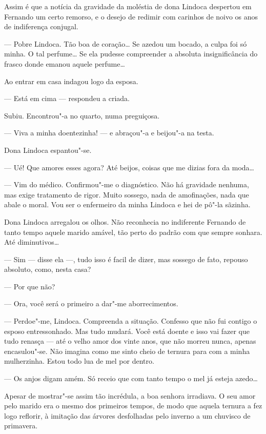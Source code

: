 Assim é que a notícia da gravidade da moléstia de dona Lindoca despertou
em Fernando um certo remorso, e o desejo de redimir com carinhos de
noivo os anos de indiferença conjugal.

--- Pobre Lindoca. Tão boa de coração\ldots{} Se azedou um bocado, a culpa
foi só minha. O tal perfume\ldots{} Se ela pudesse compreender a absoluta
insignificância do frasco donde emanou aquele perfume\ldots{}

Ao entrar em casa indagou logo da esposa.

--- Está em cima --- respondeu a criada.

Subiu. Encontrou"-a no quarto, numa preguiçosa.

--- Viva a minha doentezinha! --- e abraçou"-a e beijou"-a na testa.

Dona Lindoca espantou"-se.

--- Ué! Que amores esses agora? Até beijos, coisas que me dizias fora da
moda\ldots{}

--- Vim do médico. Confirmou"-me o diagnóstico. Não há gravidade nenhuma,
mas exige tratamento de rigor. Muito sossego, nada de amofinações, nada
que abale o moral. Vou ser o enfermeiro da minha Lindoca e hei de pô"-la
sãzinha.

Dona Lindoca arregalou os olhos. Não reconhecia no indiferente Fernando
de tanto tempo aquele marido amável, tão perto do padrão com que sempre
sonhara. Até diminutivos\ldots{}

--- Sim --- disse ela ---, tudo isso é facil de dizer, mas sossego de
fato, repouso absoluto, como, nesta casa?

--- Por que não?

--- Ora, você será o primeiro a dar"-me aborrecimentos.

--- Perdoe"-me, Lindoca. Compreenda a situação. Confesso que não fui
contigo o esposo entressonhado. Mas tudo mudará. Você está doente e isso
vai fazer que tudo renasça --- até o velho amor dos vinte anos, que não
morreu nunca, apenas encasulou"-se. Não imagina como me sinto cheio de
ternura para com a minha mulherzinha. Estou todo lua de mel por dentro.

--- Os anjos digam amém. Só receio que com tanto tempo o mel já esteja
azedo\ldots{}

Apesar de mostrar"-se assim tão incrédula, a boa senhora irradiava. O seu
amor pelo marido era o mesmo dos primeiros tempos, de modo que aquela
ternura a fez logo reflorir, à imitação das árvores desfolhadas pelo
inverno a um chuvisco de primavera.

